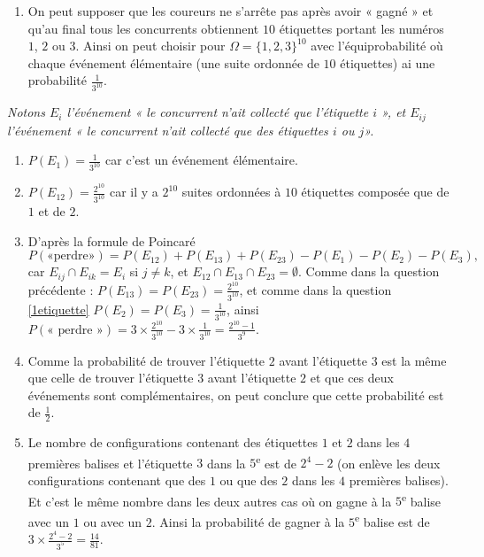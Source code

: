 \documentclass[a4paper,12pt,reqno]{amsart}
\begin{document}
\begin{solution}
  \begin{enumerate}
    \item On peut supposer que les coureurs ne s'arrête pas après avoir « gagné » et qu'au final tous les concurrents obtiennent $10$ étiquettes portant les numéros $1$, $2$ ou $3$. Ainsi on peut choisir pour $\Omega = \{1,2,3\}^{10}$ avec l'équiprobabilité où chaque événement élémentaire (une suite ordonnée de $10$ étiquettes) ai une probabilité $\frac{1}{3^{10}}$.
  \end{enumerate}

    \emph{Notons $E_{i}$ l'événement « le concurrent n'ait collecté que l'étiquette $i$ », et $E_{ij}$ l'événement « le concurrent n'ait collecté que des étiquettes $i$ ou $j$».}

  \begin{enumerate}[resume]
    \item\label{1etiquette} $P(E_{1}) = \frac{1}{3^{10}}$ car c'est un événement élémentaire.
    \item $P(E_{12}) = \frac{2^{10}}{3^{10}}$ car il y a $2^{10}$ suites ordonnées à $10$ étiquettes composée que de $1$ et de $2$.
    \item\label{perdre} D'après la formule de Poincaré
    $$
      P(\text{«perdre»}) = P(E_{12})+P(E_{13})+P(E_{23})-P(E_{1})-P(E_{2})-P(E_{3}),
    $$
    car $E_{ij} \cap E_{ik} = E_{i}$ si $j \neq k$, et $E_{12}\cap E_{13}\cap E_{23} = \emptyset$. Comme dans la question précédente : $P(E_{13}) = P(E_{23}) =\frac{2^{10}}{3^{10}}$, et comme dans la question \ref{1etiquette} $P(E_{2}) = P(E_{3}) = \frac{1}{3^{10}}$, ainsi $P(\text{« perdre »}) = 3 \times \frac{2^{10}}{3^{10}} - 3 \times \frac{1}{3^{10}}= \frac{2^{10}-1}{3^{9}}$.
    \item Comme la probabilité de trouver l'étiquette $2$ avant l'étiquette $3$ est la même que celle de trouver l'étiquette $3$ avant l'étiquette $2$ et que ces deux événements sont complémentaires, on peut conclure que cette probabilité est de $\frac{1}{2}$.
    \item Le nombre de configurations contenant des étiquettes $1$ et $2$ dans les $4$ premières balises et l'étiquette $3$ dans la $5$\textsuperscript{e} est de $2^{4}-2$ (on enlève les deux configurations contenant que des $1$ ou que des $2$ dans les $4$ premières balises). Et c'est le même nombre dans les deux autres cas où on gagne à la $5$\textsuperscript{e} balise avec un $1$ ou avec un $2$. Ainsi la probabilité de gagner à la $5$\textsuperscript{e} balise est de $3 \times \frac{2^{4}-2}{3^{5}} = \frac{14}{81}$.
  \end{enumerate}

\end{solution}
\end{document}
